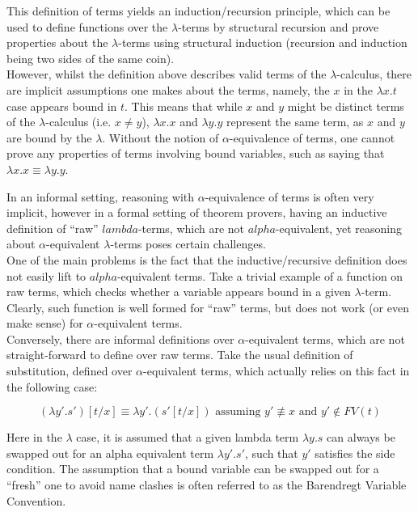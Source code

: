 \documentclass[a4paper, 12pt, twoside]{style/ociamthesis}
\begin{document}
This definition of terms yields an induction/recursion principle, which
can be used to define functions over the \(\lambda\)-terms by structural
recursion and prove properties about the \(\lambda\)-terms using
structural induction (recursion and induction being two sides of the
same coin).\\
However, whilst the definition above describes valid terms of the
\(\lambda\)-calculus, there are implicit assumptions one makes about the
terms, namely, the \(x\) in the \(\lambda x.t\) case appears bound in
\(t\). This means that while \(x\) and \(y\) might be distinct terms of
the \(\lambda\)-calculus (i.e. \(x \neq y\)), \(\lambda x.x\) and
\(\lambda y.y\) represent the same term, as \(x\) and \(y\) are bound by
the \(\lambda\). Without the notion of \(\alpha\)-equivalence of terms,
one cannot prove any properties of terms involving bound variables, such
as saying that \(\lambda x.x \equiv \lambda y.y\).

In an informal setting, reasoning with \(\alpha\)-equivalence of terms
is often very implicit, however in a formal setting of theorem provers,
having an inductive definition of ``raw'' \(lambda\)-terms, which are
not \(alpha\)-equivalent, yet reasoning about \(\alpha\)-equivalent
\(\lambda\)-terms poses certain challenges.\\
One of the main problems is the fact that the inductive/recursive
definition does not easily lift to \(alpha\)-equivalent terms. Take a
trivial example of a function on raw terms, which checks whether a
variable appears bound in a given \(\lambda\)-term. Clearly, such
function is well formed for ``raw'' terms, but does not work (or even
make sense) for \(\alpha\)-equivalent terms.\\
Conversely, there are informal definitions over \(\alpha\)-equivalent
terms, which are not straight-forward to define over raw terms. Take the
usual definition of substitution, defined over \(\alpha\)-equivalent
terms, which actually relies on this fact in the following case:

\[(\lambda y'. s')[t/x] \equiv \lambda y'.(s'[t/x]) \text{ assuming } y' \not\equiv x\text{ and }y' \not\in FV(t)\]

Here in the \(\lambda\) case, it is assumed that a given lambda term
\(\lambda y. s\) can always be swapped out for an alpha equivalent term
\(\lambda y'. s'\), such that \(y'\) satisfies the side condition. The
assumption that a bound variable can be swapped out for a ``fresh'' one
to avoid name clashes is often referred to as the Barendregt Variable
Convention.
\end{document}
